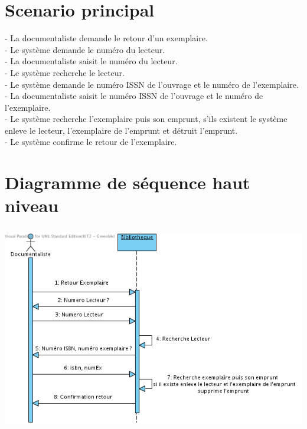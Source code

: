 \documentclass[a4paper,10pt]{report}
\begin{document}
\section*{Scenario principal}
\begin{flushleft}
- La documentaliste demande le retour d'un exemplaire.\\
- Le système demande le numéro du lecteur.\\
- La documentaliste saisit le numéro du lecteur.\\
- Le système recherche le lecteur.\\
- Le système demande le numéro ISSN de l'ouvrage et le numéro de l'exemplaire.\\
- La documentaliste saisit le numéro ISSN de l'ouvrage et le numéro de l'exemplaire.\\
- Le système recherche l'exemplaire puis son emprunt, s'ils existent le système enleve le lecteur, l'exemplaire de l'emprunt et détruit l'emprunt.\\
- Le système confirme le retour de l'exemplaire.\\
\end{flushleft}

\bigskip

\section*{Diagramme de séquence haut niveau}
\bigskip
\bigskip
{}
\includegraphics[height=90mm]{RetourExemplaireHautNiveau.png}

\newpage
\end{document}

